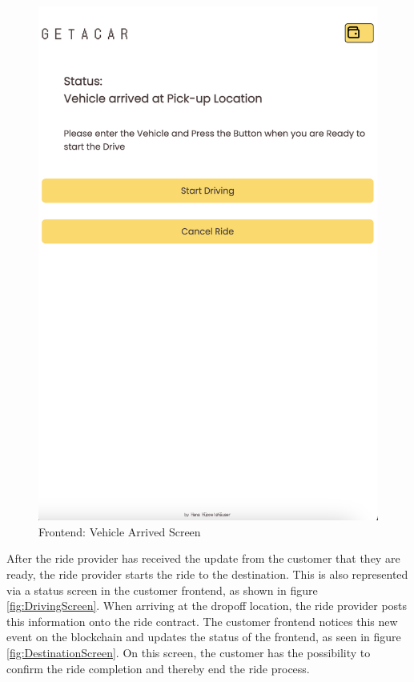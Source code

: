 \begin{figure}[H]
    \hfill
    \begin{minipage}{0.45\linewidth}
        \centering
        \includegraphics[width=\linewidth]{data/ffss/8.png}
        \caption{Frontend: Vehicle Arrived Screen}
        \label{fig:VehicleArrivedScreen}
    \end{minipage}
    
\end{figure}

After the ride provider has received the update from the customer that they are ready, the ride provider starts the ride to the destination. This is also represented via a status screen in the customer frontend, as shown in figure \ref{fig:DrivingScreen}. When arriving at the dropoff location, the ride provider posts this information onto the ride contract. The customer frontend notices this new event on the blockchain and updates the status of the frontend, as seen in figure \ref{fig:DestinationScreen}. On this screen, the customer has the possibility to confirm the ride completion and thereby end the ride process.


